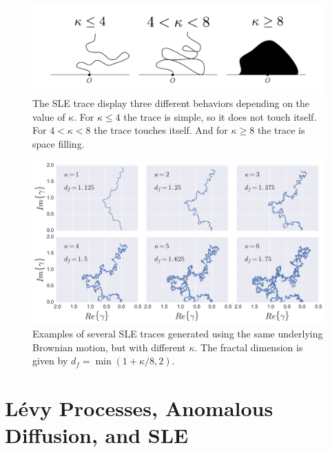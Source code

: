 \begin{figure}
\begin{center}
    \includegraphics[width=\textwidth]{chapters/ch4-sle/figs/kappa}
\end{center}
\caption{The SLE trace display three different behaviors depending on the value
    of $\kappa$. For $\kappa\leq4$ the trace is simple, so it does not touch
    itself. For $4<\kappa<8$ the trace touches itself. And for $\kappa\geq8$
    the trace is space filling.}
\label{fig:kappa}
\end{figure}

\begin{figure}
\begin{center}
    \includegraphics[width=\textwidth]{chapters/ch4-sle/figs/slefracdim}
\end{center}
\caption{Examples of several SLE traces generated using the same underlying
    Brownian motion, but with different $\kappa$. The fractal dimension is
    given by $d_f=\min(1+\kappa/8, 2)$.}
\label{fig:slefracdim}
\end{figure}


\section{Lévy Processes, Anomalous Diffusion, and SLE}
\label{sec:levy}

